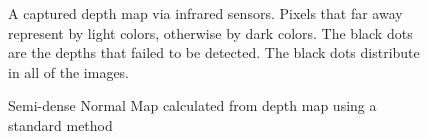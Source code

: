 
\begin{figure}[!h]
	\centering
	\caption{A captured depth map via infrared sensors. Pixels that far away represent by light colors, otherwise by dark colors. The black dots are the depths that failed to be detected. The black dots distribute in all of the images.}
	\label{fig:depth_map_with_noise}
\end{figure}


\begin{figure}[!h]
	\centering
	\caption{Semi-dense Normal Map calculated from depth map using a standard method}
	\label{fig:standard_normal_inference}
\end{figure}


